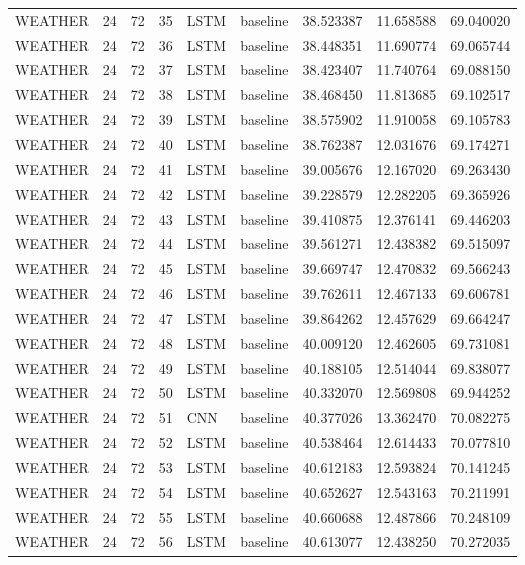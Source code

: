 \begin{table}
\begin{tabular}{lrrrllrrr}
WEATHER & 24 & 72 & 35 & LSTM & baseline & 38.523387 & 11.658588 & 69.040020 \\
WEATHER & 24 & 72 & 36 & LSTM & baseline & 38.448351 & 11.690774 & 69.065744 \\
WEATHER & 24 & 72 & 37 & LSTM & baseline & 38.423407 & 11.740764 & 69.088150 \\
WEATHER & 24 & 72 & 38 & LSTM & baseline & 38.468450 & 11.813685 & 69.102517 \\
WEATHER & 24 & 72 & 39 & LSTM & baseline & 38.575902 & 11.910058 & 69.105783 \\
WEATHER & 24 & 72 & 40 & LSTM & baseline & 38.762387 & 12.031676 & 69.174271 \\
WEATHER & 24 & 72 & 41 & LSTM & baseline & 39.005676 & 12.167020 & 69.263430 \\
WEATHER & 24 & 72 & 42 & LSTM & baseline & 39.228579 & 12.282205 & 69.365926 \\
WEATHER & 24 & 72 & 43 & LSTM & baseline & 39.410875 & 12.376141 & 69.446203 \\
WEATHER & 24 & 72 & 44 & LSTM & baseline & 39.561271 & 12.438382 & 69.515097 \\
WEATHER & 24 & 72 & 45 & LSTM & baseline & 39.669747 & 12.470832 & 69.566243 \\
WEATHER & 24 & 72 & 46 & LSTM & baseline & 39.762611 & 12.467133 & 69.606781 \\
WEATHER & 24 & 72 & 47 & LSTM & baseline & 39.864262 & 12.457629 & 69.664247 \\
WEATHER & 24 & 72 & 48 & LSTM & baseline & 40.009120 & 12.462605 & 69.731081 \\
WEATHER & 24 & 72 & 49 & LSTM & baseline & 40.188105 & 12.514044 & 69.838077 \\
WEATHER & 24 & 72 & 50 & LSTM & baseline & 40.332070 & 12.569808 & 69.944252 \\
WEATHER & 24 & 72 & 51 & CNN & baseline & 40.377026 & 13.362470 & 70.082275 \\
WEATHER & 24 & 72 & 52 & LSTM & baseline & 40.538464 & 12.614433 & 70.077810 \\
WEATHER & 24 & 72 & 53 & LSTM & baseline & 40.612183 & 12.593824 & 70.141245 \\
WEATHER & 24 & 72 & 54 & LSTM & baseline & 40.652627 & 12.543163 & 70.211991 \\
WEATHER & 24 & 72 & 55 & LSTM & baseline & 40.660688 & 12.487866 & 70.248109 \\
WEATHER & 24 & 72 & 56 & LSTM & baseline & 40.613077 & 12.438250 & 70.272035 \\

\end{tabular}
\end{table}
